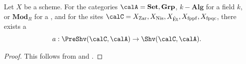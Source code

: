 \begin{corollary}  \label{corollary:sheafification_functor_exists_for_nice_enough_categories_of_sheaves_on_common_small_sites_of_schemes}
    Let $X$ be a scheme. For the categories $\calA = \mathbf{Set}, \mathbf{Grp}$, $k-\mathbf{Alg}$ for a field $k$, or $\mathbf{Mod}_R$ for a , and for the sites $\calC = X_{\mathrm{Zar}}, X_{\mathrm{Nis}}, X_{\mathrm{\acute{E}t}}, X_{\mathrm{fppf}}, X_{\mathrm{fpqc}}$,
    there exists a 
    $$a: \PreShv(\calC, \calA) \to \Shv(\calC, \calA).$$
\end{corollary}
\begin{proof}
    This follows from  and .
\end{proof}
